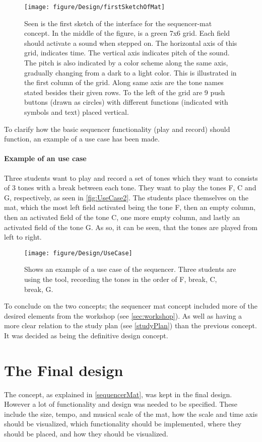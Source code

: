 \begin{figure}[H]
	\centering
	\texttt{[image: figure/Design/firstSketchOfMat]} 
	\caption{Seen is the first sketch of the interface for the sequencer-mat concept. In the middle of the figure, is a green 7x6 grid. Each field should activate a sound when stepped on. The horizontal axis of this grid, indicates time. The vertical axis indicates pitch of the sound. The pitch is also indicated by a color scheme along the same axis, gradually changing from a dark to a light color. This is illustrated in the first column of the grid. Along same axis are the tone names stated besides their given rows. To the left of the grid are 9 push buttons (drawn as circles) with different functions (indicated with symbols and text) placed vertical. }
	\label{fig:firstSketchOfMatFig}
\end{figure}

To clarify how the basic sequencer functionality (play and record) should function, an example of a use case has been made.
\paragraph{Example of an use case}
Three students want to play and record a set of tones which they want to consists of 3 tones with a break between each tone. They want to play the tones F, C and G, respectively, as seen in \autoref{fig:UseCase2}. The students place themselves on the mat, which the most left field activated being the tone F, then an empty column, then an activated field of the tone C, one more empty column, and lastly an activated field of the tone G. As so, it can be seen, that the tones are played from left to right.   
\begin{figure}[H]
	\centering
	\texttt{[image: figure/Design/UseCase]} 
	\caption{Shows an example of a use case of the sequencer. Three students are using the tool, recording the tones in the order of F, break, C, break, G. }
	\label{fig:UseCase2}
\end{figure}

To conclude on the two concepts; the sequencer mat concept included more of the desired elements from the workshop (see \autoref{sec:workshop}). As well as having a more clear relation to the study plan (see \autoref{studyPlan}) than the previous concept.
It was decided as being the definitive design concept.

\section{The Final design}\label{designConcept}
The concept, as explained in \autoref{sequencerMat}, was kept in the final design. However a lot of functionality and design was needed to be specified. These include the size, tempo, and musical scale of the mat, how the scale and time axis should be visualized, which functionality should be implemented, where they should be placed, and how they should be visualized.


